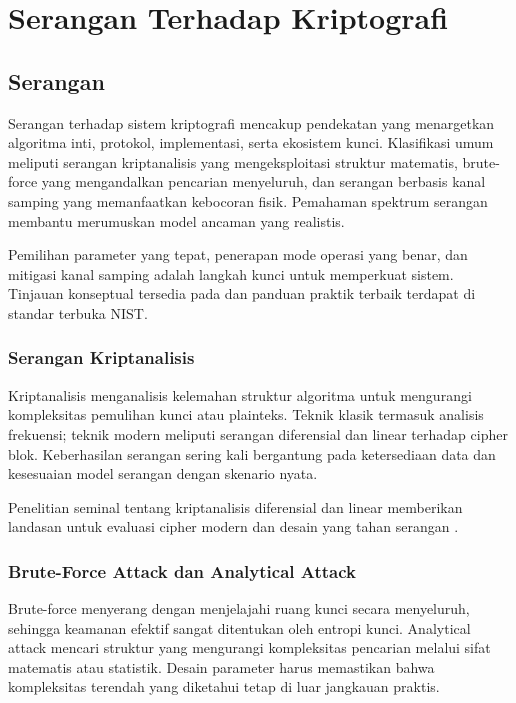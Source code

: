 \documentclass[../main.tex]{subfiles}
\begin{document}
\chapter{Serangan Terhadap Kriptografi}

\section{Serangan}
Serangan terhadap sistem kriptografi mencakup pendekatan yang menargetkan algoritma inti, protokol, implementasi, serta ekosistem kunci. Klasifikasi umum meliputi serangan kriptanalisis yang mengeksploitasi struktur matematis, brute-force yang mengandalkan pencarian menyeluruh, dan serangan berbasis kanal samping yang memanfaatkan kebocoran fisik. Pemahaman spektrum serangan membantu merumuskan model ancaman yang realistis.

Pemilihan parameter yang tepat, penerapan mode operasi yang benar, dan mitigasi kanal samping adalah langkah kunci untuk memperkuat sistem. Tinjauan konseptual tersedia pada \textcite{menezes1996handbook} dan panduan praktik terbaik terdapat di standar terbuka NIST.

\subsection{Serangan Kriptanalisis}
Kriptanalisis menganalisis kelemahan struktur algoritma untuk mengurangi kompleksitas pemulihan kunci atau plainteks. Teknik klasik termasuk analisis frekuensi; teknik modern meliputi serangan diferensial dan linear terhadap cipher blok. Keberhasilan serangan sering kali bergantung pada ketersediaan data dan kesesuaian model serangan dengan skenario nyata.

Penelitian seminal tentang kriptanalisis diferensial dan linear memberikan landasan untuk evaluasi cipher modern dan desain yang tahan serangan \parencite{biham1991differential}.

\subsection{Brute-Force Attack dan Analytical Attack}
Brute-force menyerang dengan menjelajahi ruang kunci secara menyeluruh, sehingga keamanan efektif sangat ditentukan oleh entropi kunci. Analytical attack mencari struktur yang mengurangi kompleksitas pencarian melalui sifat matematis atau statistik. Desain parameter harus memastikan bahwa kompleksitas terendah yang diketahui tetap di luar jangkauan praktis.
\end{document}

